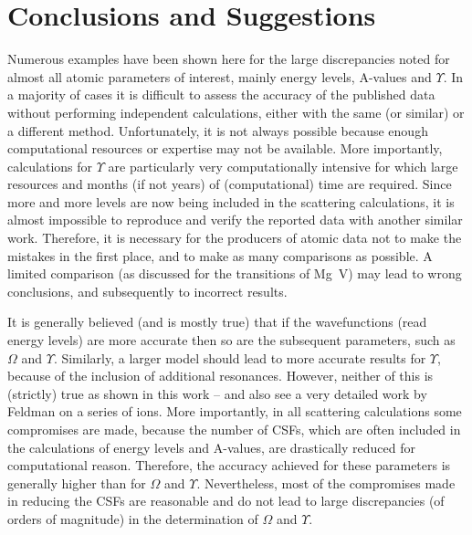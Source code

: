 \documentclass[fleqn]{article}
\begin{document}
\section{Conclusions and Suggestions}

Numerous examples have been shown here for the large discrepancies noted for almost all atomic parameters of interest, mainly energy levels, A-values and $\Upsilon$. In a majority of cases it is difficult to assess the accuracy of the published data without performing independent calculations, either with the same (or similar) or a different method. Unfortunately, it is not always possible because enough computational resources or expertise may not be available. More importantly, calculations for $\Upsilon$ are particularly very computationally intensive for which large resources and months (if not years) of (computational) time are required. Since more and more levels are now being included in the scattering calculations, it is almost impossible to reproduce and verify the reported data with another  similar work. Therefore, it is necessary for the producers of atomic data not to make the mistakes in the first place, and to make as many comparisons as possible. A limited comparison (as discussed for the transitions of Mg~V) may lead to wrong conclusions, and subsequently to incorrect results. 

It is generally believed (and is mostly true)  that if the wavefunctions (read energy levels) are more accurate then so are the subsequent parameters, such as $\Omega$ and $\Upsilon$. Similarly,  a larger model should lead to more accurate results for $\Upsilon$, because of the inclusion of additional resonances. However, neither of this is (strictly) true as shown in this work --  and also see a very detailed work by Feldman \cite{uf} on a series of ions. More importantly, in all scattering calculations some compromises are made, because the number of CSFs, which are often included in the calculations of energy levels and A-values, are drastically reduced for computational reason. Therefore, the accuracy achieved for these parameters is generally higher than for $\Omega$ and $\Upsilon$. Nevertheless, most of the compromises made in reducing the CSFs are reasonable and do not lead to large discrepancies (of orders of magnitude) in the determination of $\Omega$ and $\Upsilon$.
\end{document}
